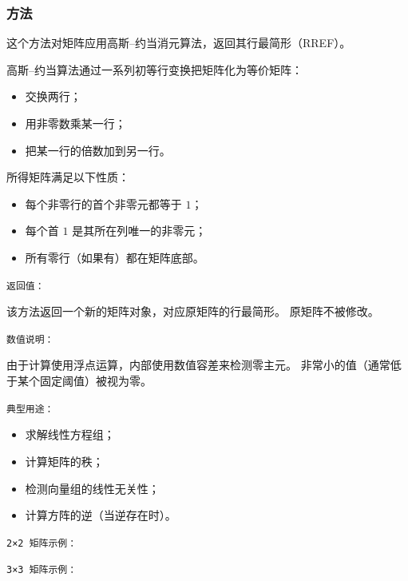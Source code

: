 \subsubsection{方法 }
\label{ssub:method_matrix_gauss_jordan}


这个方法对矩阵应用高斯–约当消元算法，返回其行最简形（RREF）。

\medskip
高斯–约当算法通过一系列初等行变换把矩阵化为等价矩阵：
\begin{itemize}
\item 交换两行；
\item 用非零数乘某一行；
\item 把某一行的倍数加到另一行。
\end{itemize}
所得矩阵满足以下性质：
\begin{itemize}
\item 每个非零行的首个非零元都等于 $1$；
\item 每个首 $1$ 是其所在列唯一的非零元；
\item 所有零行（如果有）都在矩阵底部。
\end{itemize}

\medskip
\texttt{返回值：}

该方法返回一个新的矩阵对象，对应原矩阵的行最简形。
原矩阵不被修改。

\medskip
\texttt{数值说明：}

由于计算使用浮点运算，内部使用数值容差来检测零主元。
非常小的值（通常低于某个固定阈值）被视为零。

\medskip
\texttt{典型用途：}

\begin{itemize}
\item 求解线性方程组；
\item 计算矩阵的秩；
\item 检测向量组的线性无关性；
\item 计算方阵的逆（当逆存在时）。
\end{itemize}

\texttt{2×2 矩阵示例：}

\begin{tkzexample}[latex=.5\textwidth]
\end{tkzexample}

\texttt{3×3 矩阵示例：}

\begin{tkzexample}[latex=.5\textwidth]
\end{tkzexample}




